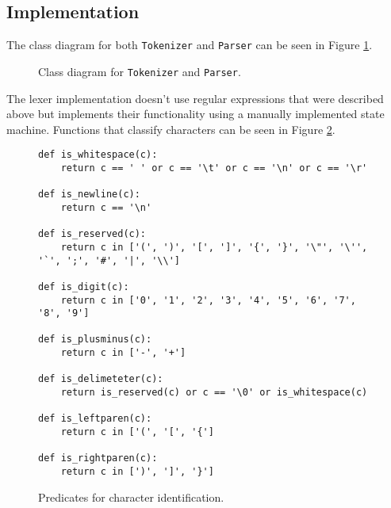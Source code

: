 \subsection{Implementation}
The class diagram for both \texttt{Tokenizer} and \texttt{Parser} can be seen in Figure \ref{class-diagram-lexer-parser}.

\begin{figure}[h]
	\centering
\caption{Class diagram for \texttt{Tokenizer} and \texttt{Parser}.}
\label{class-diagram-lexer-parser}
\end{figure}

The lexer implementation doesn't use regular expressions that were described above but implements their functionality using a manually implemented state machine. Functions that classify characters can be seen in Figure \ref{characterpredicates}.

\begin{figure}[h]
\begin{verbatim}
def is_whitespace(c):
    return c == ' ' or c == '\t' or c == '\n' or c == '\r'

def is_newline(c):
    return c == '\n'

def is_reserved(c): 
    return c in ['(', ')', '[', ']', '{', '}', '\"', '\'', '`', ';', '#', '|', '\\']

def is_digit(c):
    return c in ['0', '1', '2', '3', '4', '5', '6', '7', '8', '9']

def is_plusminus(c):
    return c in ['-', '+']

def is_delimeteter(c):
    return is_reserved(c) or c == '\0' or is_whitespace(c)

def is_leftparen(c):
	return c in ['(', '[', '{']

def is_rightparen(c):
	return c in [')', ']', '}']
\end{verbatim}
\caption{Predicates for character identification.}
\label{characterpredicates}
\end{figure}


